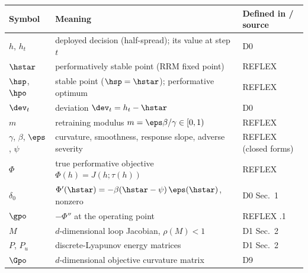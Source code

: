 \begin{center}\small
\begin{tabular}{@{}lp{4.9cm}l@{}}
\hline
Symbol & Meaning & Defined in / source\\
\hline
$h$, $h_t$ & deployed decision (half-spread); its value at
  step $t$ & D0\\
$\hstar$ & performatively stable point (RRM fixed point)
  & REFLEX \citep{reflex2026}\\
$\hsp$, $\hpo$ & stable point ($\hsp = \hstar$); performative
  optimum & REFLEX \citep{reflex2026}\\
$\dev_t$ & deviation $\dev_t = h_t - \hstar$ & D0\\
$m$ & retraining modulus $m = \eps\beta/\gamma \in [0,1)$
  & REFLEX \citep{reflex2026}\\
$\gamma$, $\beta$, $\eps$, $\psi$ & curvature, smoothness,
  response slope, adverse severity & REFLEX \citep{reflex2026} (closed forms)\\
$\Phi$ & true performative objective $\Phi(h) = J(h;\tau(h))$
  & REFLEX \citep{reflex2026}\\
$\delta_0$ & $\Phi'(\hstar) = -\beta(\hstar-\psi)\,\eps(\hstar)$,
  nonzero & D0 Sec.~1\\
$\gpo$ & $-\Phi''$ at the operating point & REFLEX \citep{reflex2026}.1\\
$M$ & $d$-dimensional loop Jacobian, $\rho(M) < 1$ & D1 Sec.~2\\
$P$, $P_u$ & discrete-Lyapunov energy matrices & D1 Sec.~2\\
$\Gpo$ & $d$-dimensional objective curvature matrix & D9\\
\hline
\end{tabular}
\end{center}

